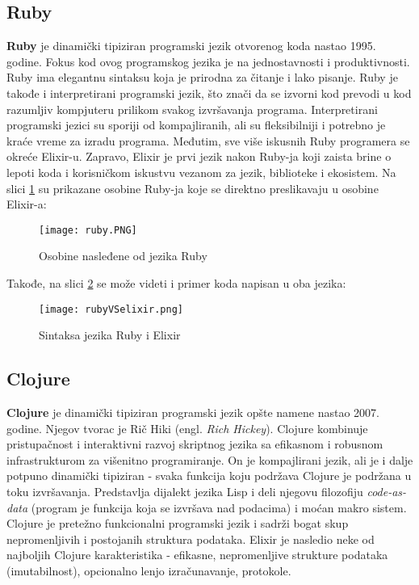 \documentclass[12pt,oneside]{memoir}
\begin{document}
\subsection{Ruby}
\textbf{Ruby} je dinamički tipiziran programski jezik otvorenog koda nastao 1995. godine. Fokus kod ovog programskog jezika je na jednostavnosti i produktivnosti. Ruby ima elegantnu sintaksu koja je prirodna za čitanje i lako pisanje.
Ruby je takođe i interpretirani programski jezik, što znači da se izvorni kod prevodi u kod razumljiv kompjuteru prilikom svakog izvršavanja programa. Interpretirani programski jezici su sporiji od kompajliranih, ali su fleksibilniji i potrebno je kraće vreme za izradu programa.
Međutim, sve više iskusnih Ruby programera se okreće Elixir-u. Zapravo, Elixir je prvi jezik nakon Ruby-ja koji zaista brine o lepoti koda i korisničkom iskustvu vezanom za jezik, biblioteke i ekosistem. Na slici \ref{fig:0} su prikazane osobine Ruby-ja koje se direktno preslikavaju u osobine Elixir-a:

\begin{figure}[!ht]
  \centering
  \texttt{[image: ruby.PNG]}
  \caption{Osobine nasleđene od jezika Ruby}
  \label{fig:0}
\end{figure}

Takođe, na slici \ref{fig:01} se može videti i primer koda napisan u oba jezika:

\begin{figure}[!ht]
  \centering
  \texttt{[image: rubyVSelixir.png]}
  \caption{Sintaksa jezika Ruby i Elixir}
  \label{fig:01}
\end{figure}

\subsection{Clojure}
\textbf{Clojure} je dinamički tipiziran programski jezik opšte namene nastao 2007. godine. Njegov tvorac je Rič Hiki (engl. \textit{Rich Hickey}). Clojure kombinuje pristupačnost i interaktivni razvoj skriptnog jezika sa efikasnom i robusnom infrastrukturom za višenitno programiranje. On je kompajlirani jezik, ali je i dalje potpuno dinamički tipiziran - svaka funkcija koju podržava Clojure je podržana u toku izvršavanja. Predstavlja dijalekt jezika Lisp i deli njegovu filozofiju \textit{code-as-data} (program je funkcija koja se izvršava nad podacima) i moćan makro sistem. Clojure je pretežno funkcionalni programski jezik i sadrži bogat skup nepromenljivih i postojanih struktura podataka. Elixir je nasledio neke od najboljih Clojure karakteristika - efikasne, nepromenljive strukture podataka (imutabilnost), opcionalno lenjo izračunavanje, protokole.
\newpage
\end{document}
